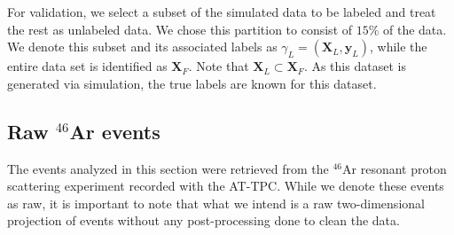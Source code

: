 \documentclass[preprint,12pt]{elsarticle}
\begin{document}
For validation, we select a subset of the simulated data to be labeled and treat the rest as unlabeled data. We chose this partition to consist of  $15\%$ of the data. We denote this subset and its associated labels as $\gamma_L=(\boldsymbol{X}_L, \boldsymbol{y}_L)$, while the entire data set is identified as $\boldsymbol{X}_F$. Note that $\boldsymbol{X}_L \subset \boldsymbol{X}_F$.
As this dataset is generated via simulation, the true labels are known for this dataset.

\subsection{Raw \texorpdfstring{${}^{46}$Ar}{46Ar}  events}\label{sec:data_real}

The events analyzed in this section were retrieved from the ${}^{46}$Ar resonant proton scattering experiment recorded with the AT-TPC. 
While we denote these events as raw, it is important to note that what we intend is a raw two-dimensional projection of events without any post-processing done to clean the data.

\end{document}
